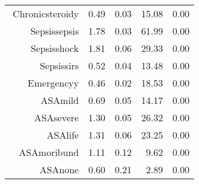 \begin{tabular}{rrrrr}
$$  Chronic\-steroid\-y & 0.49 & 0.03 & 15.08 & 0.00 \\ 
  Sepsis\-sepsis & 1.78 & 0.03 & 61.99 & 0.00 \\ 
  Sepsis\-shock & 1.81 & 0.06 & 29.33 & 0.00 \\ 
  Sepsis\-sirs & 0.52 & 0.04 & 13.48 & 0.00 \\ 
  Emergency\-y & 0.46 & 0.02 & 18.53 & 0.00 \\ 
  ASA\-mild & 0.69 & 0.05 & 14.17 & 0.00 \\ 
  ASA\-severe & 1.30 & 0.05 & 26.32 & 0.00 \\ 
  ASA\-life & 1.31 & 0.06 & 23.25 & 0.00 \\ 
  ASA\-moribund & 1.11 & 0.12 & 9.62 & 0.00 \\ 
  ASA\-none & 0.60 & 0.21 & 2.89 & 0.00 \\ 
   \hline
\end{tabular}

